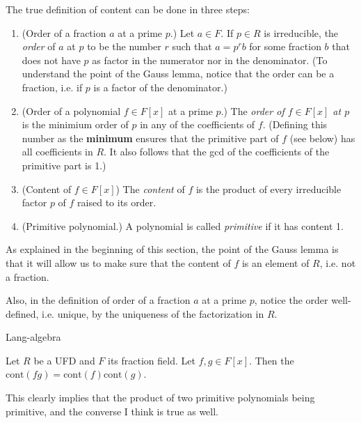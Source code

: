 \medskip\noindent
The true definition of content can be done in three steps:
\begin{definition}
\label{definition-content}
\begin{reference}
\cite[p. 181]{Lang-algebra}
\end{reference}
\begin{enumerate}
\item (Order of a fraction $a$ at a prime $p$.) 
Let $a \in F$. If $p \in R$ is irreducible, the {\it order} of $a$ at $p$
to be the number $r$ such that $a=p^rb$ for some fraction $b$ that does not have
$p$ as factor in the numerator nor in the denominator. (To understand the point
of the Gauss lemma, notice that the order
can be a fraction, i.e. if $p$ is a factor of the denominator.)
\item (Order of a polynomial $f \in F[x]$ at a prime $p$.) 
The {\it  order of $f\in F[x]$ at $p$} is the minimium order of
$p$ in any of the coefficients of $f$. (Defining this number as the {\bf
minimum} ensures that the primitive part of $f$ (see below) has all coefficients
in $R$. It also follows that the gcd of the 
coefficients of the primitive part is 1.)
\item (Content of $f \in F[x]$) The {\it content} of $f$ is the product
of every irreducible factor $p$ of $f$ raised to its order.
\item (Primitive polynomial.) A polynomial is
called {\it primitive} if it has content 1.
\end{enumerate}
\end{definition}

As explained in the beginning of this section, the point of the Gauss
lemma is that it will allow us to make sure that the content of $f$ is an
element of $R$, i.e. not a fraction.

Also, in the definition of order of a fraction $a$ at a prime $p$, notice
 the order well-defined, i.e. unique, by the uniqueness of the factorization
in $R$.

\begin{lemma}
\label{lemma-true-Gauss}
\begin{reference}
\cite{Chapter 4, Theorem 2.1}{Lang-algebra}
\end{reference}
Let $R$ be a UFD and $F$ its fraction field. Let $f,g\in F[x]$. Then the
$\text{cont}(fg)=\text{cont}(f)\text{cont}(g)$.
\end{lemma}

This clearly implies that the product of two primitive polynomials being
primitive, and the converse I think is true as well.

